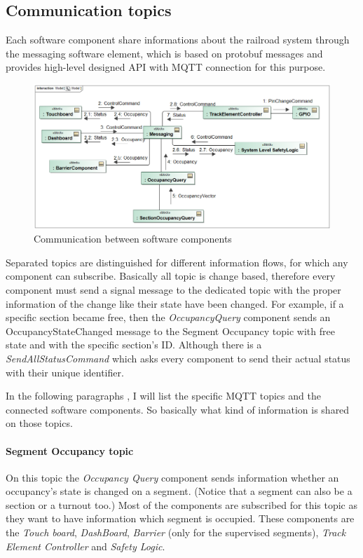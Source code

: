 \subsection{Communication topics}
Each software component share informations about the railroad system through the messaging software element, which is based on protobuf messages and provides high-level designed API with MQTT connection for this purpose. 
\begin{figure}[ht]
	\centering
	\includegraphics[width=150mm, keepaspectratio]{figures/modes3/CommunicationModel.png}
	\caption{Communication between software components}
	\label{fig:communicationModel}
\end{figure}

Separated topics are distinguished for different information flows, for which any component can subscribe. Basically all topic is change based, therefore every component must send a signal message to the dedicated topic with the proper information of the change like their state have been changed. For example, if a specific section became free, then the \textit{OccupancyQuery} component sends an OccupancyStateChanged message to the Segment Occupancy topic with free state and with the specific section's ID. Although there is a \textit{SendAllStatusCommand} which asks every component to send their actual status with their unique identifier.

In the following paragraphs , I will list the specific MQTT topics and the connected software components. So basically what kind of information is shared on those topics.

\paragraph{Segment Occupancy topic}
On this topic the \textit{Occupancy Query} component sends information whether an occupancy's state is changed on a segment. (Notice that a segment can also be a section or a turnout too.) Most of the components are subscribed for this topic as they want to have information which segment is occupied. These components are the \textit{Touch board}, \textit{DashBoard}, \textit{Barrier} (only for the supervised segments), \textit{Track Element Controller} and \textit{Safety Logic}.

